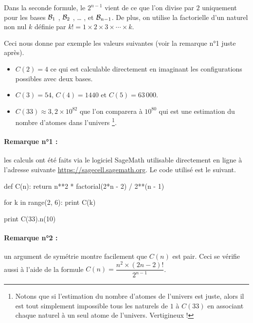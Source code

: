 Dans la seconde formule, le $2^{n-1}$ vient de ce que l'on divise par $2$ uniquement pour les bases ${\cal B}_1$ , ${\cal B}_2$ , \dots{} , et  ${\cal B}_{n - 1}$.
De plus, on utilise la factorielle d'un naturel non nul $k$ définie par $k! = 1 \times 2 \times 3 \times \cdots  \times k$.


\medskip

Ceci nous donne par exemple les valeurs suivantes (voir la remarque n°1 juste après).
	

\medskip

\begin{itemize}
	\item[\textbullet] $C(2) = 4$ ce qui est calculable directement en imaginant les configurations possibles avec deux bases.

	\medskip

	\item[\textbullet] $C(3) = 54$,
	                   $C(4) = 1440$ et
	                   $C(5) = 63\,000$.

	\medskip

	\item[\textbullet] $C(33) \approx 3,\!2 \times 10^{82}$ que l'on comparera à $10^{80}$ qui est une estimation du nombre d'atomes dans l'univers
	\footnote{
		Notons que si l'estimation du nombre d'atomes de l'univers est juste, alors il est tout simplement impossible  tous les naturels de $1$ à $C(33)$ en associant chaque naturel à un seul atome de l'univers. Vertigineux !
	}.
\end{itemize}


\paragraph{Remarque n°1 :} \hspace{-1em} les calculs ont été faits via le logiciel SageMath utilisable directement en ligne à l'adresse suivante \url{https://sagecell.sagemath.org}. Le code utilisé est le suivant.

\bigskip

\begin{myverb}
def C(n):
    return n**2 * factorial(2*n - 2) / 2**(n - 1)

for k in range(2, 6):
    print C(k)

print C(33).n(10)

\end{myverb}


\medskip

\paragraph{Remarque n°2 :} \hspace{-1em} un argument de symétrie montre facilement que $C(n)$ est pair. Ceci se vérifie aussi à l'aide de la formule $C(n) = \dfrac{n^2 \times (2n - 2)!}{2^{n-1}}$.


